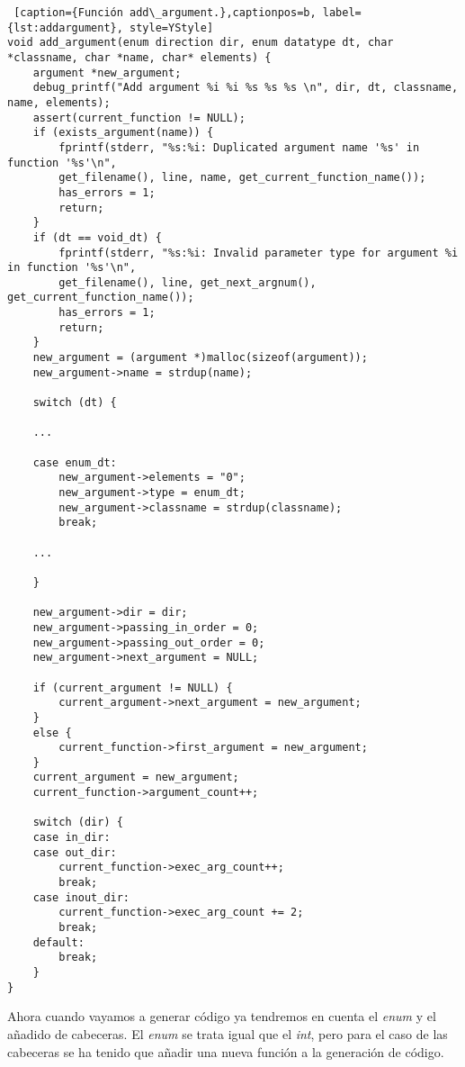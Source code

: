 \begin{minipage}{\linewidth}
\begin{lstlisting} [caption={Función add\_argument.},captionpos=b, label={lst:addargument}, style=YStyle]
void add_argument(enum direction dir, enum datatype dt, char *classname, char *name, char* elements) {
	argument *new_argument;
	debug_printf("Add argument %i %i %s %s %s \n", dir, dt, classname, name, elements);
	assert(current_function != NULL);
	if (exists_argument(name)) {
		fprintf(stderr, "%s:%i: Duplicated argument name '%s' in function '%s'\n",
		get_filename(), line, name, get_current_function_name());
		has_errors = 1;
		return;
	}
	if (dt == void_dt) {
		fprintf(stderr, "%s:%i: Invalid parameter type for argument %i in function '%s'\n",
		get_filename(), line, get_next_argnum(), get_current_function_name());
		has_errors = 1;
		return;
	}
	new_argument = (argument *)malloc(sizeof(argument));
	new_argument->name = strdup(name);

    switch (dt) {
    
    ...
    
    case enum_dt:
    	new_argument->elements = "0";
    	new_argument->type = enum_dt;
    	new_argument->classname = strdup(classname);
    	break;
    
    ...
    
    }
    
    new_argument->dir = dir;
    new_argument->passing_in_order = 0;
    new_argument->passing_out_order = 0;
    new_argument->next_argument = NULL;
    
    if (current_argument != NULL) {
    	current_argument->next_argument = new_argument;
    } 
    else {
    	current_function->first_argument = new_argument;
    }
    current_argument = new_argument;
    current_function->argument_count++;
    
    switch (dir) {
    case in_dir:
    case out_dir:
    	current_function->exec_arg_count++;
    	break;
    case inout_dir:
    	current_function->exec_arg_count += 2;
    	break;
    default:
    	break;
    }
}
\end{lstlisting}
\end{minipage}

\par\bigskip
Ahora cuando vayamos a generar código ya tendremos en cuenta el \textit{enum} y el añadido de cabeceras. El \textit{enum} se trata igual que el \textit{int}, pero para el caso de las cabeceras se ha tenido que añadir una nueva función a la generación de código. 
\bigskip

